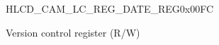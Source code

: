 \begin{register}{H}{LCD\_CAM\_LC\_REG\_DATE\_REG}{0x{}00FC}\label{regdesc:LCDCAMLCREGDATEREG}
%
%
\regnewline%
\begin{regdesc}\begin{reglist}
\label{fielddesc:LCDCAMLCDATE}\item [LCD\_CAM\_LC\_DATE] Version control register (R/W)
\end{reglist}\end{regdesc}
\end{register}


